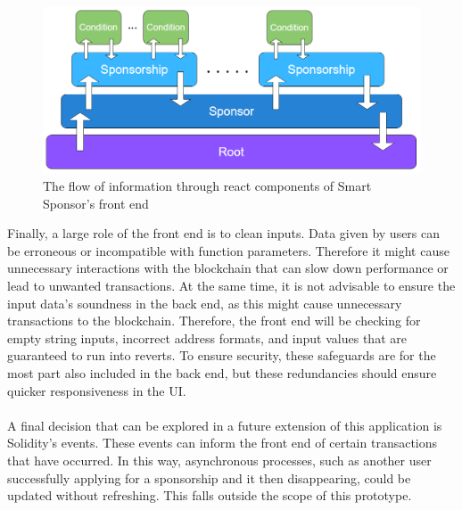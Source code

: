 \begin{figure}[H]
    \centering
    \includegraphics[scale=0.5]{figures/sponsor front end.PNG}  
    \caption{The flow of information through react components of Smart Sponsor's front end}
    \label{fig:sponsorfront}
\end{figure}
Finally, a large role of the front end is to clean inputs. Data given by users can be erroneous or incompatible with function parameters. Therefore it might cause unnecessary interactions with the blockchain that can slow down performance or lead to unwanted transactions. At the same time, it is not advisable to ensure the input data's soundness in the back end, as this might cause unnecessary transactions to the blockchain. Therefore, the front end will be checking for empty string inputs, incorrect address formats, and input values that are guaranteed to run into reverts. To ensure security, these safeguards are for the most part also included in the back end, but these redundancies should ensure quicker responsiveness in the UI.\\
\\
A final decision that can be explored in a future extension of this application is Solidity's events. These events can inform the front end of certain transactions that have occurred. In this way, asynchronous processes, such as another user successfully applying for a sponsorship and it then disappearing, could be updated without refreshing. This falls outside the scope of this prototype.
